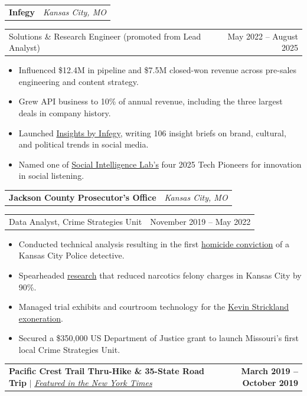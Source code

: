 \documentclass[letterpaper,11pt]{article}
\makeatletter
\newcommand{\resumeItem}[1]{
    \item\small{{#1 \vspace{-2pt}}}
  }
\newcommand{\resumeCompany}[2]{
    \vspace{4pt}\item
      \begin{tabular*}{1.0\textwidth}[t]{l@{\extracolsep{\fill}}r}
        \textbf{#1} & {\color{muted}\textit{\small #2}} \\
      \end{tabular*}\vspace{-7pt}
  }
\newcommand{\resumeRole}[2]{
    \item
      \begin{tabular*}{1.0\textwidth}[t]{l@{\extracolsep{\fill}}r}
        {\mediumfont\small #1} & {\color{muted}\small #2} \\
      \end{tabular*}\vspace{-7pt}
  }
\newcommand{\resumeProjectHeading}[2]{
    \item
      \begin{tabular*}{1.001\textwidth}{l@{\extracolsep{\fill}}r}
        \small#1 & \textbf{\small #2}\\
      \end{tabular*}\vspace{-7pt}
  }
\newcommand{\resumeItemListStart}{\begin{itemize}}
\newcommand{\resumeItemListEnd}{\end{itemize}\vspace{-4pt}}
\makeatother
\begin{document}
      \resumeCompany{Infegy}{Kansas City, MO}
      \resumeRole{Solutions \& Research Engineer (promoted from Lead Analyst)}{May 2022 -- August 2025}
        \resumeItemListStart
          \resumeItem{Influenced \$12.4M in pipeline and \$7.5M closed-won revenue across pre-sales engineering and content strategy.}
          \resumeItem{Grew API business to 10\% of annual revenue, including the three largest deals in company history.}
          \resumeItem{Launched \href{https://www.infegy.com/insight-brief}{Insights by Infegy}, writing 106 insight briefs on brand, cultural,
  and political trends in social media.}
          \resumeItem{Named one of \href{https://www.thesilab.com/social-intelligence-insider-winners/henry-chapman}{Social Intelligence Lab's}
  four 2025 Tech Pioneers for innovation in social listening.}
        \resumeItemListEnd

      \resumeCompany{Jackson County Prosecutor's Office}{Kansas City, MO}
      \resumeRole{Data Analyst, Crime Strategies Unit}{November 2019 -- May 2022}
        \resumeItemListStart
          \resumeItem{Conducted technical analysis resulting in the first
  \href{https://www.nytimes.com/2021/11/20/us/cameron-lamb-eric-devalkenaere.html}{homicide conviction} of a Kansas City Police detective.}
          \resumeItem{Spearheaded \href{https://www.kansascity.com/news/local/crime/article252634928.html}{research} that
  reduced narcotics felony charges in Kansas City by 90\%.}
          \resumeItem{Managed trial exhibits and courtroom technology for the
  \href{https://www.npr.org/2021/11/24/1058811665/kevin-strickland-released-wrongful-conviction}{Kevin Strickland exoneration}.}
          \resumeItem{Secured a \$350,000 US Department of Justice grant to launch Missouri's first local Crime Strategies Unit.}
        \resumeItemListEnd
\vspace{-7pt}
\resumeProjectHeading
  {\textbf{Pacific Crest Trail Thru-Hike \& 35-State Road Trip} $|$ \emph{\href{https://www.nytimes.com/2020/08/14/fashion/weddings/perfectly-in-sync-during-a-35-state-road-trip-and-a-1200-mile-hike.html}{Featured in the New York Times}}}{\mdseries\color{muted}March 2019 -- October 2019}\vspace{-7pt}
\end{document}
